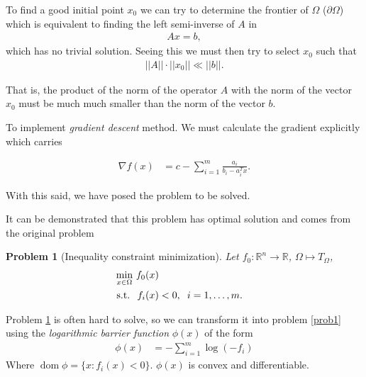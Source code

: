 \documentclass[a4paper,8pt,twocolumn]{article}
\DeclareMathOperator{\dom}{\mathrm{dom}}
\DeclareMathOperator{\subjectto}{\mathrm{s.t.}}
\newtheorem{problem}{Problem}
\begin{document}
To find a good initial point $x_0$ we can try to determine the frontier of $\Omega$ ($\partial\Omega$) which is equivalent to finding the left semi-inverse of $A$ in 
\begin{equation}
\begin{aligned}
Ax=b,
\end{aligned}
\end{equation}
which has no trivial solution. Seeing this we must then try to select $x_0$ such that
\begin{equation}
\begin{aligned}
||A||\cdot||x_0|| \ll ||b||.
\end{aligned}
\end{equation}

That is, the product of the norm of the operator $A$ with the norm of the vector $x_0$ must be much much smaller than the norm of the vector $b$.

To implement \emph{gradient descent} method. We must calculate the gradient explicitly which carries

\begin{equation}
\begin{aligned}
\nabla f(x)&=c -\sum_{i=1}^m \frac{a_i}{b_i-a_i^Tx}.
\end{aligned}
\end{equation}

With this said, we have posed the problem to be solved.

It can be demonstrated  \cite{Boyd2002} that this problem has optimal solution and comes from the original problem
\begin{problem}[Inequality constraint minimization] \label{prob3}
Let $ f_0 : \mathbb{R}^{n} \rightarrow \mathbb{R}$, $\Omega \mapsto T_\Omega$,
\begin{equation}
\begin{aligned}
\min_{x\in \Omega}\, f_0(x)\\
\subjectto \hspace{0.2cm} f_i(x)&< 0, \hspace{0.2cm} i=1,\dots,m.
\end{aligned}
\end{equation}
\end{problem}
Problem \ref{prob3} is often hard to solve, so we can transform it into problem \ref{prob1} using the \emph{logarithmic barrier function} $\phi(x)$ of the form
\begin{equation}
\begin{aligned}
\phi(x)&=-\sum_{i=1}^m\log (-f_i)
\end{aligned}
\end{equation}
Where $\dom \phi = \{x: f_i(x)<0\}$. $\phi(x)$ is convex and differentiable.
\end{document}
